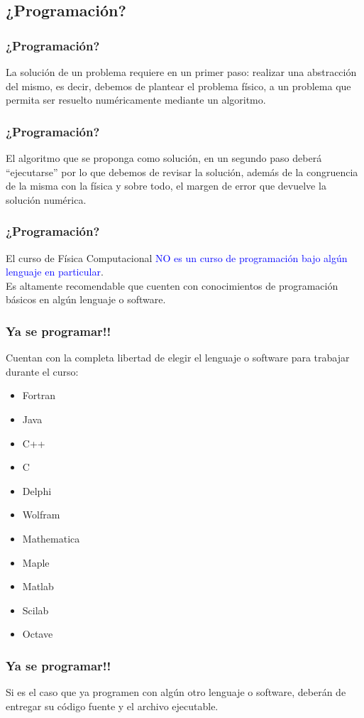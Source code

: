 \documentclass[12pt]{beamer}
\newcommand{\textoazul}[1]{\textcolor{blue}{#1}}
\begin{document}
\subsection{¿Programación?}
\begin{frame}
\frametitle{¿Programación?}
La solución de un problema requiere en un primer paso:  realizar una abstracción del mismo, es decir, debemos de plantear el problema físico, a un problema que permita ser resuelto numéricamente mediante un algoritmo.
\end{frame}
\begin{frame}
\frametitle{¿Programación?}
El algoritmo que se proponga como solución, en un segundo paso deberá \enquote{ejecutarse} por lo que debemos de revisar la solución, además de la congruencia de la misma con la física y sobre todo, el margen de error que devuelve la solución numérica.
\end{frame}
\begin{frame}
\frametitle{¿Programación?}
El curso de Física Computacional \textoazul{NO es un curso de programación bajo algún lenguaje en particular}.
\\
\bigskip
Es altamente recomendable que cuenten con conocimientos de programación básicos en algún lenguaje o software.
\end{frame}
\begin{frame}
\frametitle{Ya se programar!!}
Cuentan con la completa libertad de elegir el lenguaje o software para trabajar durante el curso:
\begin{multicols}{2}
\begin{itemize}
\item Fortran
\item Java
\item C++
\item C
\item Delphi
\item Wolfram
\item Mathematica
\item Maple
\item Matlab
\item Scilab
\item Octave
\end{itemize}
\end{multicols}
\end{frame}
\begin{frame}
\frametitle{Ya se programar!!}
Si es el caso que ya programen con algún otro lenguaje o software, deberán de entregar su código fuente y el archivo ejecutable.
\end{frame}
\end{document}
